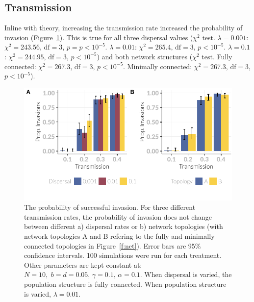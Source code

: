 
\subsection{Transmission}

Inline with theory, increasing the transmission rate increased the probability of invasion (Figure~\ref{f:invasionPropPlots}).
This is true for all three dispersal values ($\chi^2$ test. $\lambda = 0.001$: $\chi^2 = 243.56$, $\text{df} = 3$, $p = p < 10^{-5}$. $\lambda = 0.01$: $\chi^2 = 265.4$, $\text{df} = 3$, $p < 10^{-5}$. $\lambda = 0.1$: $\chi^2 = 244.95$, $\text{df} = 3$, $p < 10^{-5}$) and both network structures ($\chi^2$ test. Fully connected: $\chi^2 = 267.3$, $\text{df} = 3$, $p < 10^{-5}$. Minimally connected: $\chi^2 =  267.3$, $\text{df} = 3$, $p < 10^{-5}$).






\begin{knitrout}\footnotesize
{}\color{fgcolor}\begin{figure}[t]

{\centering \includegraphics[width=\textwidth]{figure/invasionPropPlots-1} 

}

\caption[The probability of invasion across different dispersal rates and network topologies.]{The probability of successful invasion. 
  For three different transmission rates, the probability of invasion does not change between different a) dispersal rates or b) network topologies (with network topologies A and B refering to the    fully and minimally connected topologies in Figure~\ref{f:net}). 
  Error bars are 95\% confidence intervals. 
  100 simulations were run for each treatment.
  Other parameters are kept constant at: $N = 10,\, \, b = d = 0.05,\, \gamma = 0.1,\, \alpha = 0.1$. 
  When dispersal is varied, the population structure is fully connected. When population structure is varied, $\lambda = 0.01$.}\label{f:invasionPropPlots}
\end{figure}


\end{knitrout}




